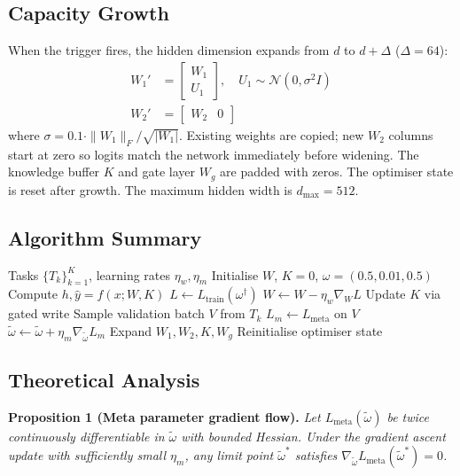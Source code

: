 \documentclass[conference]{IEEEtran}
\begin{document}
\subsection{Capacity Growth}
When the trigger fires, the hidden dimension expands from $d$ to $d + \Delta$ ($\Delta = 64$):
\begin{align}
    W_1' &= \begin{bmatrix} W_1 \\ U_1 \end{bmatrix}, \quad U_1 \sim \mathcal{N}(0, \sigma^2 I) \\
    W_2' &= \begin{bmatrix} W_2 & 0 \end{bmatrix}
\end{align}
where $\sigma = 0.1 \cdot \|W_1\|_F / \sqrt{|W_1|}$. Existing weights are copied; new $W_2$ columns start at zero so logits match the network immediately before widening. The knowledge buffer $K$ and gate layer $W_g$ are padded with zeros. The optimiser state is reset after growth. The maximum hidden width is $d_{\max} = 512$.

\subsection{Algorithm Summary}
\begin{algorithm}
\caption{NCG Training Loop}
\begin{algorithmic}[1]
\Require Tasks $\{T_k\}_{k=1}^{K}$, learning rates $\eta_w, \eta_m$
\State Initialise $W$, $K = 0$, $\omega = (0.5, 0.01, 0.5)$
            \State Compute $h, \hat{y} = f(x; W, K)$
            \State $L \leftarrow L_{\mathrm{train}}(\omega^{\dagger})$
            \State $W \leftarrow W - \eta_w \nabla_W L$
            \State Update $K$ via gated write
        \EndFor
        \State Sample validation batch $V$ from $T_k$
        \State $L_m \leftarrow L_{\mathrm{meta}}$ on $V$
        \State $\tilde{\omega} \leftarrow \tilde{\omega} + \eta_m \nabla_{\tilde{\omega}} L_m$ 
            \State Expand $W_1, W_2, K, W_g$
            \State Reinitialise optimiser state
        \EndIf
    \EndFor
\EndFor
\end{algorithmic}
\end{algorithm}

\subsection{Theoretical Analysis}
\textbf{Proposition 1 (Meta parameter gradient flow).} \textit{Let $L_{\mathrm{meta}}(\tilde{\omega})$ be twice continuously differentiable in $\tilde{\omega}$ with bounded Hessian. Under the gradient ascent update with sufficiently small $\eta_m$, any limit point $\tilde{\omega}^*$ satisfies $\nabla_{\tilde{\omega}} L_{\mathrm{meta}}(\tilde{\omega}^*) = 0$.}
\end{document}
